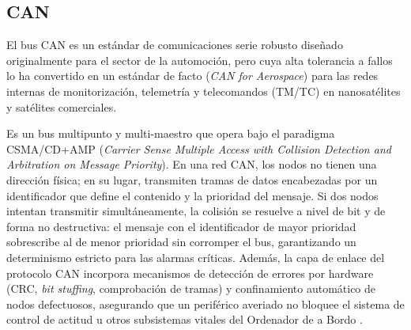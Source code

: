 \subsection{CAN}

El bus CAN es un estándar de comunicaciones serie robusto diseñado originalmente para el
sector de la automoción, pero cuya alta tolerancia a fallos lo ha convertido en un estándar
de facto (\textit{CAN for Aerospace}) para las redes internas de monitorización, telemetría y
telecomandos (TM/TC) en nanosatélites y satélites comerciales.

Es un bus multipunto y multi-maestro que opera bajo el paradigma CSMA/CD+AMP
(\textit{Carrier Sense Multiple Access with Collision Detection and Arbitration on Message
Priority}). En una red CAN, los nodos no tienen una dirección física; en su lugar, transmiten
tramas de datos encabezadas por un identificador que define el contenido y la prioridad del
mensaje. Si dos nodos intentan transmitir simultáneamente, la colisión se resuelve a nivel de
bit y de forma no destructiva: el mensaje con el identificador de mayor prioridad sobrescribe
al de menor prioridad sin corromper el bus, garantizando un determinismo estricto para las
alarmas críticas. Además, la capa de enlace del protocolo CAN incorpora mecanismos de
detección de errores por hardware (CRC, \textit{bit stuffing}, comprobación de tramas) y
confinamiento automático de nodos defectuosos, asegurando que un periférico averiado no
bloquee el sistema de control de actitud u otros subsistemas vitales del Ordenador de a Bordo
\cite{iso118981,esa2015can}.
